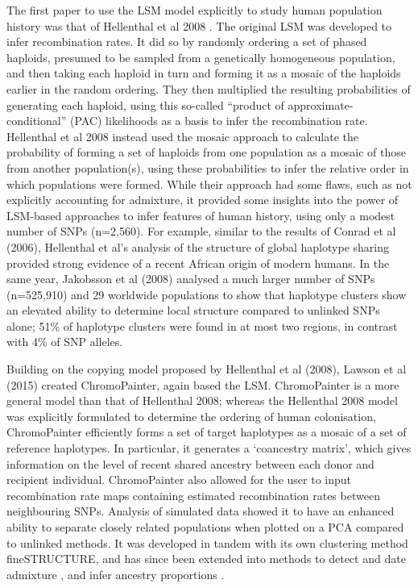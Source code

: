 The first paper to use the LSM model explicitly to study human population history was that of Hellenthal et al 2008 \cite{hellenthal2008inferring}. The original LSM was developed to infer recombination rates. It did so by randomly ordering a set of phased haploids, presumed to be sampled from a genetically homogeneous population, and then taking each haploid in turn and forming it as a mosaic of the haploids earlier in the random ordering. They then multiplied the resulting probabilities of generating each haploid, using this so-called ``product of approximate-conditional'' (PAC) likelihoods as a basis to infer the recombination rate. Hellenthal et al 2008 instead used the mosaic approach to calculate the probability of forming a set of haploids from one population as a mosaic of those from another population(s), using these probabilities to infer the relative order in which populations were formed. While their approach had some flaws, such as not explicitly accounting for admixture, it provided some insights into the power of LSM-based approaches to infer features of human history, using only a modest number of SNPs (n=2,560). For example, similar to the results of Conrad et al (2006), Hellenthal et al's analysis of the structure of global haplotype sharing provided strong evidence of a recent African origin of modern humans. In the same year, Jakobsson et al (2008) analysed a much larger number of SNPs (n=525,910) and 29 worldwide populations \cite{jakobsson2008genotype} to show that haplotype clusters show an elevated ability to determine local structure compared to unlinked SNPs alone;  51\% of haplotype clusters were found in at most two regions, in contrast with 4\% of SNP alleles. 

Building on the copying model proposed by Hellenthal et al (2008), Lawson et al (2015) \cite{Lawson2012} created ChromoPainter, again based the LSM. ChromoPainter is a more general model than that of Hellenthal 2008; whereas the Hellenthal 2008 model was explicitly formulated to determine the ordering of human colonisation, ChromoPainter efficiently forms a set of target haplotypes as a mosaic of a set of reference haplotypes. In particular, it generates a `coancestry matrix', which gives information on the level of recent shared ancestry between each donor and recipient individual. ChromoPainter also allowed for the user to input recombination rate maps containing estimated recombination rates between neighbouring SNPs. Analysis of simulated data showed it to have an enhanced ability to separate closely related populations when plotted on a PCA compared to unlinked methods. It was developed in tandem with its own clustering method fineSTRUCTURE, and has since been extended into methods to detect and date admixture \cite{Hellenthal2014}, and infer ancestry proportions \cite{Hellenthal2014,Chacon-Duque2018}. 

